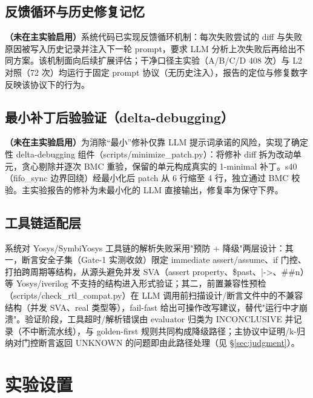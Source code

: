 \documentclass[journal]{IEEEtran}
\begin{document}
\subsection{反馈循环与历史修复记忆}\label{sec:feedback}

\textbf{（未在主实验启用）}系统代码已实现反馈循环机制：每次失败尝试的 diff 与失败原因被写入历史记录并注入下一轮 prompt，要求 LLM 分析上次失败后再给出不同方案。该机制面向后续扩展评估；干净口径主实验（A/B/C/D 408 次）与 L2 对照（72 次）均运行于固定 prompt 协议（无历史注入），报告的定位与修复数字反映该协议下的行为。

\subsection{最小补丁后验验证（delta-debugging）}\label{sec:minimality}

\textbf{（未在主实验启用）}为消除\textquotedblleft 最小\textquotedblright 修补仅靠 LLM 提示词承诺的风险，实现了确定性 delta-debugging 组件（scripts/minimize\_patch.py）：将修补 diff 拆为改动单元，贪心剔除并逐次 BMC 重验，保留的单元构成真实的 1-minimal 补丁。s40（fifo\_sync 边界回绕）经最小化后 patch 从 6 行缩至 4 行，独立通过 BMC 校验。主实验报告的修补为未最小化的 LLM 直接输出，修复率为保守下界。

\subsection{工具链适配层}\label{sec:toolchain}

系统对 Yosys/SymbiYosys 工具链的解析失败采用"预防 + 降级"两层设计：其一，断言安全子集（Gate-1 实测收敛）限定 immediate assert/assume、if 门控、打拍跨周期等结构，从源头避免并发 SVA（assert property、\$past、|->、\#\#n）等 Yosys/iverilog 不支持的结构进入形式验证；其二，前置兼容性预检（scripts/check\_rtl\_compat.py）在 LLM 调用前扫描设计/断言文件中的不兼容结构（并发 SVA、real 类型等），fail-fast 给出可操作改写建议，替代"运行中才崩溃"。验证阶段，工具超时/解析错误由 evaluator 归类为 INCONCLUSIVE 并记录（不中断流水线），与 golden-first 规则共同构成降级路径；主协议中证明/k-归纳对门控断言返回 UNKNOWN 的问题即由此路径处理（见 \S\ref{sec:judgment}）。

\section{实验设置}\label{sec:setup}
\end{document}
